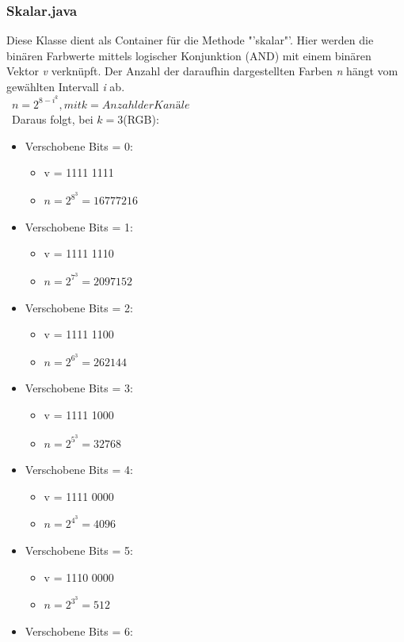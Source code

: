 \begin{description}
\subsubsection{Skalar.java}
\label{Skalar}
Diese Klasse dient als Container für die Methode "'skalar"'. Hier werden die binären Farbwerte mittels logischer Konjunktion (AND) mit einem binären Vektor \textit{v} verknüpft. Der Anzahl der daraufhin dargestellten Farben \textit{n} hängt vom gewählten Intervall \textit{i} ab.\\\ 
\( n = 2^{{8-i}^k}, mit k = Anzahl der Kanäle\) \\\
Daraus folgt, bei \(k = 3\)(RGB):
\begin{itemize}
\item Verschobene Bits = 0:  
\begin{itemize}
\item v = 1111 1111
\item \( n = 2^{8^3} = 16777216 \)
\end{itemize}
\item Verschobene Bits = 1:
\begin{itemize}
\item v = 1111 1110
\item \( n = 2^{7^3} =  2097152 \)
\end{itemize}
\item Verschobene Bits = 2:
\begin{itemize}
\item v = 1111 1100
\item \( n = 2^{6^3} =   262144 \)
\end{itemize}  
\item Verschobene Bits = 3:
\begin{itemize}
\item v = 1111 1000
\item \( n = 2^{5^3} =    32768 \) 
\end{itemize}
\item Verschobene Bits = 4:
\begin{itemize}
\item v = 1111 0000
\item \( n = 2^{4^3} =     4096 \) 
\end{itemize}  
\item Verschobene Bits = 5:
\begin{itemize}
\item v = 1110 0000
\item \( n = 2^{3^3} =      512 \) 
\end{itemize}  
\item Verschobene Bits = 6:

\end{itemize}
\end{description}
